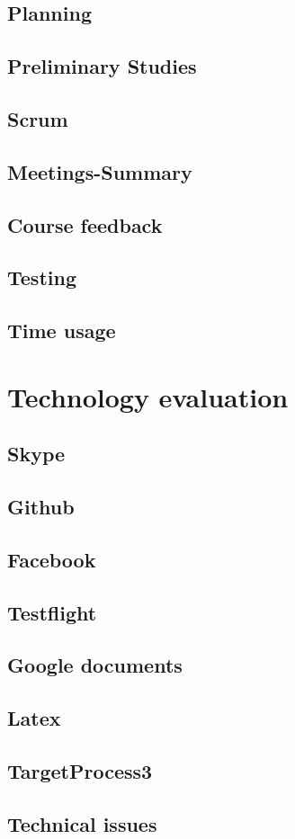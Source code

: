 \subsection{Planning}
\subsection{Preliminary Studies}
\subsection{Scrum}
\subsection{Meetings-Summary}
\subsection{Course feedback}
\subsection{Testing}
\subsection{Time usage}
\section{Technology evaluation}
\subsection{Skype}
\subsection{Github}
\subsection{Facebook}
\subsection{Testflight}
\subsection{Google documents}
\subsection{Latex}
\subsection{TargetProcess3}
\subsection{Technical issues}
